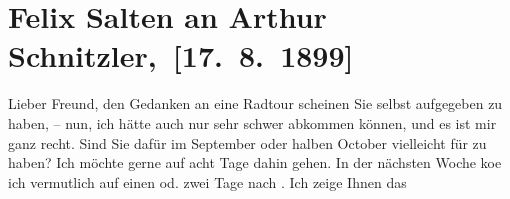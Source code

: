 

         
         \renewcommand{\erwaehntePersonen}{Personen: Richard Beer-Hofmann, Houston Stewart Chamberlain, Theodor Herzl, Ottilie Salten, Franz Servaes, Karl von Thaler, Jakob Wassermann}
         \renewcommand{\erwaehnteInstitutionen}{Institutionen: Bruckmann Verlag, Neue Freie Presse}
         \renewcommand{\erwaehnteOrte}{Orte: Bad Ischl, Dubrovnik, München, Seeboden, Wien}
         \renewcommand{\erwaehnteWerke}{Werke: Decadence-Romane, Die Grundlagen des Neunzehnten Jahrhunderts. 2 Bde., Die Welt (Wien), Neue Freie Presse, Tagebuch, »Das fremde Volk«, »Das fremde Volk«. I., »Das fremde Volk«. II., »Das fremde Volk«. III.}
               \section[ Felix Salten an Arthur Schnitzler, {[}17. 8. 1899{]}]{ Felix Salten an Arthur Schnitzler, {[}17. 8. 1899{]}}\nopagebreak{}\rehead{ }\begin{ledgroupsized}[t]{13cm}\normalsize\beginnumbering \toendnotes[C]{\smallbreak\pagebreak[2]} 
\toendnotes[C]{\smallbreak}\pstart
           \noindent{}{\pb}Lieber Freund, den Gedanken an eine Radtour scheinen Sie selbst
               aufgegeben zu haben, – nun, ich hätte auch nur sehr schwer abkommen können, und es
               ist mir ganz recht. Sind Sie dafür im September oder
               halben October vielleicht für \label{K_L03297-1v}\label{K_L03297-1h} zu haben? Ich
               möchte gerne auf acht Tage dahin gehen. In der nächsten Woche ko{\geminationm}e ich vermutlich auf einen od. zwei Tage nach \label{K_L03297-2v}\label{K_L03297-2h}. Ich zeige Ihnen das

\end{ledgroupsized}
